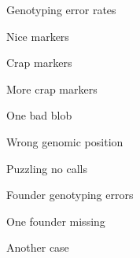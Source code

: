 \documentclass[aspectratio=169,12pt,t]{beamer}
\begin{document}
\begin{frame}[c]{Genotyping error rates}

\note{
}
\end{frame}

\begin{frame}[c]{Nice markers}

\note{
}
\end{frame}

\begin{frame}[c]{Crap markers}

\note{
}
\end{frame}

\begin{frame}[c]{More crap markers}

\note{
}
\end{frame}

\begin{frame}[c]{One bad blob}

\note{
}
\end{frame}

\begin{frame}[c]{Wrong genomic position}

\note{
}
\end{frame}

\begin{frame}[c]{Puzzling no calls}

\note{
}
\end{frame}



\begin{frame}[c]{}

\centerline{\Large \color{title} Founder genotyping errors}

\note{
}

\end{frame}


\begin{frame}[c]{One founder missing}

\note{
}
\end{frame}


\begin{frame}[c]{Another case}

\note{
}
\end{frame}
\end{document}
